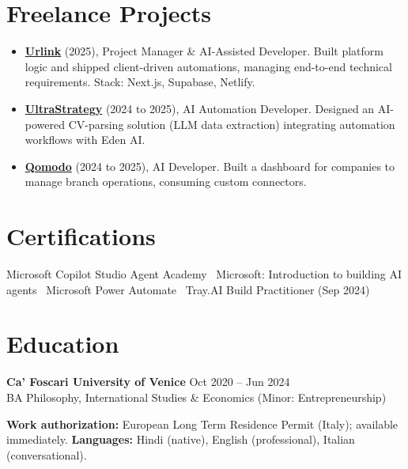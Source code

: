 \documentclass[a4paper,10pt]{article}
\begin{document}
\section{Freelance Projects}
\begin{itemize}
 \item \textbf{\href{https://smarturlink.com/}{Urlink}} (2025), Project Manager \& AI-Assisted Developer. Built platform logic and shipped client-driven automations, managing end-to-end technical requirements. Stack: Next.js, Supabase, Netlify.
 \item \textbf{\href{https://ultrastrategy.com}{UltraStrategy}} (2024 to 2025), AI Automation Developer. Designed an AI-powered CV-parsing solution (LLM data extraction) integrating automation workflows with Eden AI.
 \item \textbf{\href{https://www.qomodo.me/}{Qomodo}} (2024 to 2025), AI Developer. Built a dashboard for companies to manage branch operations, consuming custom connectors.
\end{itemize}

\section{Certifications}
Microsoft Copilot Studio Agent Academy \textbullet\ Microsoft: Introduction to building AI agents \textbullet\ Microsoft Power Automate \textbullet\ Tray.AI Build Practitioner (Sep 2024)

\section{Education}
\textbf{Ca' Foscari University of Venice} \hfill Oct 2020 -- Jun 2024\\
BA Philosophy, International Studies \& Economics (Minor: Entrepreneurship)

\vspace{2pt}
{\small \textbf{Work authorization:} European Long Term Residence Permit (Italy); available immediately. \quad \textbf{Languages:} Hindi (native), English (professional), Italian (conversational).}
\end{document}
